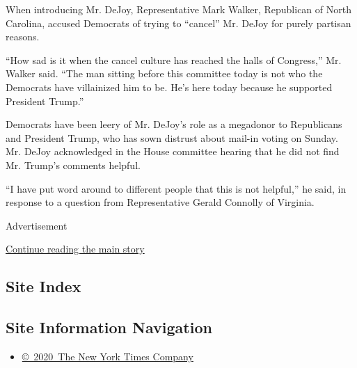 When introducing Mr. DeJoy, Representative Mark Walker, Republican of
North Carolina, accused Democrats of trying to ``cancel'' Mr. DeJoy for
purely partisan reasons.

``How sad is it when the cancel culture has reached the halls of
Congress,'' Mr. Walker said. ``The man sitting before this committee
today is not who the Democrats have villainized him to be. He's here
today because he supported President Trump.''

Democrats have been leery of Mr. DeJoy's role as a megadonor to
Republicans and President Trump, who has sown distrust about mail-in
voting on Sunday. Mr. DeJoy acknowledged in the House committee hearing
that he did not find Mr. Trump's comments helpful.

``I have put word around to different people that this is not helpful,''
he said, in response to a question from Representative Gerald Connolly
of Virginia.

Advertisement

\protect\hyperlink{after-bottom}{Continue reading the main story}

\hypertarget{site-index}{%
\subsection{Site Index}\label{site-index}}

\hypertarget{site-information-navigation}{%
\subsection{Site Information
Navigation}\label{site-information-navigation}}

\begin{itemize}
\tightlist
\item
  \href{https://help.nytimes3xbfgragh.onion/hc/en-us/articles/115014792127-Copyright-notice}{©~2020~The
  New York Times Company}
\end{itemize}

